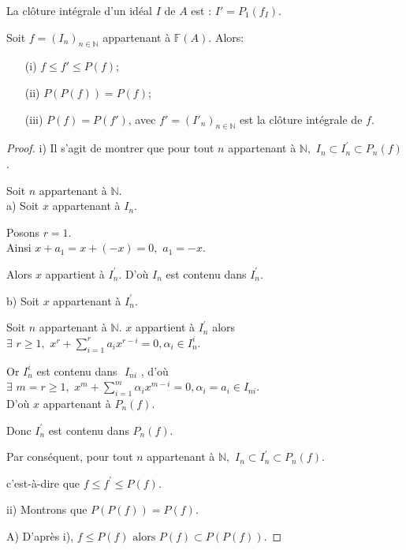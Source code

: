 \begin{maremarque}
	La clôture intégrale d'un idéal $I$ de $A$ est : $I'=P_1(f_I)$.
\end{maremarque}
\begin{maproposition}
	Soit $f=(I_n)_{n \in \mathbb{N}} $ appartenant à $ \mathbb{F}(A)$. Alors:
	\begin{enumerate}
		\item[(i)] $ f \leqslant f' \leqslant P(f)$;
		\item[(ii)] $ P(P(f)) = P(f)$;
		\item[(iii)] $P(f) = P(f')$, avec $f'=(I'_n)_{n \in \mathbb{N}}$ est la clôture intégrale de $f$.
	\end{enumerate}
\end{maproposition}
\begin{proof}
	i) Il s'agit de montrer que pour tout $n$ appartenant à $ \mathbb{N},$ $I_{n}\subset I_{n}^{\prime }\subset P_{n}(f)$.
	
	Soit $n$ appartenant à $ \mathbb{N}.$ \\
	a) Soit $x$ appartenant à $ I_{n}.$
	
	Posons $r=1$.\\
	Ainsi $x+a_{1}=x+(-x)=0,$ $a_{1}=-x$.
	
	Alors $x$ appartient à $ I_{n}^{\prime }.$ D'où $I_{n}$ est contenu dans $ I_{n}^{\prime }.$
	
	b) Soit $x$ appartenant à $ I_{n}^{\prime }.$
	
	Soit $n$ appartenant à $ \mathbb{N}.$
	$x$ appartient à $ I_{n}^{\prime }$ alors \\ $\exists$  $r\geq 1,$ $x^{r}+\sum\limits_{i=1}^{r}a_{i}x^{r-i}=0,\alpha _{i}\in I_{n}^{i}$.
	
	Or $I_{n}^{i}$ est contenu dans $ $ $I_{ni}$ , d'où \\ $\exists$  $m=r\geq 1,$ $x^{m}+\sum\limits_{i=1}^{m}\alpha _{i}x^{m-i}=0,\alpha _{i}=a_{i}\in I_{ni}$.\\
	D'où $x$ appartenant à $ P_{n}(f)$.
	
	Donc $I_{n}^{\prime }$ est contenu dans $ P_{n}(f)$.
	
	Par conséquent, pour tout $n$ appartenant à $ \mathbb{N},$ $I_{n}\subset I_{n}^{\prime }\subset P_{n}(f).$
	
	c'est-\`{a}-dire que $f\leq f^{\prime }\leq P(f)$.
	
	ii) Montrons que $P(P(f))=P(f).$
	
	A) D'après i), $f\leq P(f)\text{ alors } P(f)\subset P(P(f))$.
	

\end{proof}
